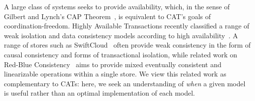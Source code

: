  A large class of systems
seeks to provide availability, which, in the sense of Gilbert and
Lynch's CAP Theorem~\cite{gilbert-cap}, is equivalent to CAT's goals
of coordination-freedom. Highly Available Transactions recently
classified a range of weak isolation and data consistency models
according to high availability~\cite{hat-vldb}. A range of stores such
as SwiftCloud~\cite{swift} often provide weak consistency in the form
of causal consistency and forms of transactional isolation, while
related work on Red-Blue Consistency~\cite{redblue} aims to provide
mixed eventually consistent and linearizable operations within a
single store. We view this related work as complementary to CATs:
here, we seek an understanding of \textit{when} a given model is
useful rather than an optimal implementation of each model.
